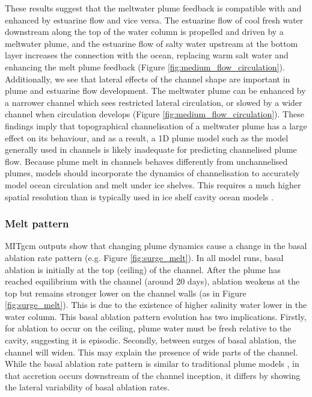 These results suggest that the meltwater plume feedback is compatible with and enhanced by estuarine flow and vice versa. The estuarine flow of cool fresh water downstream along the top of the water column is propelled and driven by a meltwater plume, and the estuarine flow of salty water upstream at the bottom layer increases the connection with the ocean, replacing warm salt water and enhancing the melt plume feedback (Figure \ref{fig:medium_flow_circulation}).
Additionally, we see that lateral effects of the channel shape are important in plume and estuarine flow development. The meltwater plume can be enhanced by a narrower channel which sees restricted lateral circulation, or slowed by a wider channel when circulation develops (Figure \ref{fig:medium_flow_circulation}). 
These findings imply that topographical channelisation of a meltwater plume has a large effect on its behaviour, and as a result, a 1D plume model such as the \cite{jenkins2011convection} model generally used in channels \citep[e.g.][]{marsh2016high} is likely inadequate for predicting channelised plume flow.
Because plume melt in channels behaves differently from unchannelised plumes, models should incorporate the dynamics of channelisation to accurately model ocean circulation and melt under ice shelves. This requires a much higher spatial resolution than is typically used in ice shelf cavity ocean models \cite[e.g.][]{holland2003modelling}. 

\subsubsection{Melt pattern}

MITgcm outputs show that changing plume dynamics cause a change in the basal ablation rate pattern (e.g. Figure \ref{fig:surge_melt}). In all model runs, basal ablation is initially at the top (ceiling) of the channel. After the plume has reached equilibrium with the channel (around 20 days), ablation weakens at the top but remains stronger lower on the channel walls (as in Figure \ref{fig:surge_melt}). This is due to the existence of higher salinity water lower in the water column. This basal ablation pattern evolution has two implications. Firstly, for ablation to occur on the ceiling, plume water must be fresh {relative} to the cavity, suggesting it is episodic. Secondly, between surges of basal ablation, the channel will widen. This may explain the presence of wide parts of the channel.
While the basal ablation rate pattern is similar to traditional plume models \citep[e.g.][]{jenkins2011convection}, in that accretion occurs downstream of the channel inception, it differs by showing the lateral variability of basal ablation rates. 

